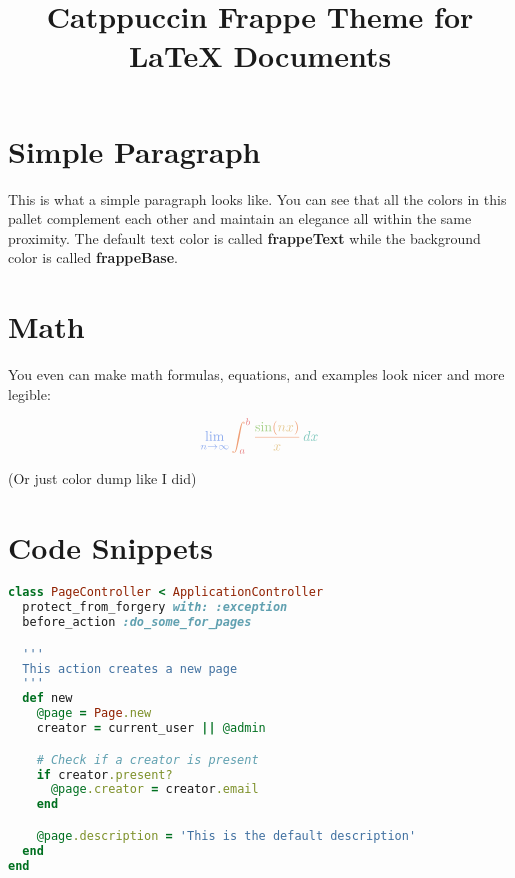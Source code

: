 \documentclass[12pt]{article}
\title{ \Huge \textbf{\textcolor{frappePink}{Catppuccin Frappe Theme for} \textcolor{frappeLavender}{\LaTeX{} Documents}} \vspace{-3em}}
\date{}
\begin{document}
\maketitle

\section{\textcolor{frappeSky}{Simple Paragraph}}
\textcolor{frappeYellow}{This is what a simple paragraph looks like.} You can see that all the colors in this pallet complement each other and maintain an elegance all within the same proximity. The default text color is called \textbf{\textcolor{frappeGreen}{frappeText}} while the background color is called \textbf{\textcolor{frappeGreen}{frappeBase}}.

\section{\textcolor{frappeSky}{Math}}

You even can make math formulas, equations, and examples look nicer and more legible:


\[\large{
    \textcolor{frappeBlue}{\lim_{{n \to \infty}} \textcolor{frappePeach}{\int_{\textcolor{frappeRed}{a}}^{\textcolor{frappeRed}{b}} \frac{\textcolor{frappeGreen}{\sin}(\textcolor{frappeYellow}{nx})}{\textcolor{frappeYellow}{x}} \, \textcolor{frappeTeal}{dx}}}
}\]

\tiny{(Or just color dump like I did)}

\section{\textcolor{frappeSky}{Code Snippets}}

\begin{lstlisting}[language=Ruby,style=ruby_on_rails, caption={A ruby on rails code sample}]
class PageController < ApplicationController
  protect_from_forgery with: :exception
  before_action :do_some_for_pages

  '''
  This action creates a new page
  '''
  def new
    @page = Page.new
    creator = current_user || @admin

    # Check if a creator is present
    if creator.present?
      @page.creator = creator.email
    end

    @page.description = 'This is the default description'
  end
end
\end{lstlisting}
\end{document}
